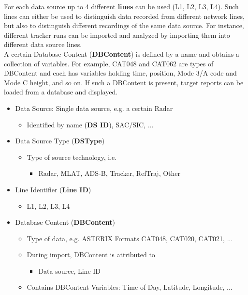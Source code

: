 For each data source up to 4 different \textbf{lines} can be used (L1, L2, L3, L4). 
Such lines can either be used to distinguish data recorded from different network lines, but also to distinguish different recordings of the same data source. 
For instance, different tracker runs can be imported and analyzed by importing them into different data source lines. \\

A certain Database Content (\textbf{DBContent}) is defined by a name and obtains a collection of variables. 
For example, CAT048 and CAT062 are types of DBContent and each has variables holding time, position, Mode 3/A code and Mode C height, and so on. 
If such a DBContent is present, target reports can be loaded from a database and displayed.\\

\begin{itemize}
\item Data Source: Single data source, e.g. a certain Radar
\begin{itemize}
\item Identified by name (\textbf{DS ID}), SAC/SIC, ...
\end{itemize}
\item Data Source Type (\textbf{DSType})
\begin{itemize}
\item Type of source technology, i.e.
\begin{itemize}
\item Radar, MLAT, ADS-B, Tracker, RefTraj, Other
\end{itemize}
\end{itemize}
\item Line Identifier (\textbf{Line ID})
\begin{itemize}
\item L1, L2, L3, L4
\end{itemize}
\item Database Content (\textbf{DBContent}) 
\begin{itemize}
\item Type of data, e.g. ASTERIX Formats CAT048, CAT020, CAT021, ...
\item During import, DBContent is attributed to 
\begin{itemize}
\item Data source, Line ID
\end{itemize}
\item Contains DBContent Variables: Time of Day, Latitude, Longitude, ...
\end{itemize}
\end{itemize}

